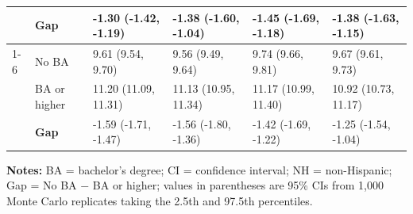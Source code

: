 \begin{threeparttable}
\begin{tabular}{llllll}
 & \textbf{Gap} & -1.30 (-1.42, -1.19) & -1.38 (-1.60, -1.04) & -1.45 (-1.69, -1.18) & -1.38 (-1.63, -1.15) \\
\cmidrule(lr){1-6}
\multirow{3}{*}{Hispanic} & No BA & 9.61 (9.54, 9.70) & 9.56 (9.49, 9.64) & 9.74 (9.66, 9.81) & 9.67 (9.61, 9.73) \\
 & BA or higher & 11.20 (11.09, 11.31) & 11.13 (10.95, 11.34) & 11.17 (10.99, 11.40) & 10.92 (10.73, 11.17) \\
 & \textbf{Gap} & -1.59 (-1.71, -1.47) & -1.56 (-1.80, -1.36) & -1.42 (-1.69, -1.22) & -1.25 (-1.54, -1.04) \\
\bottomrule
\end{tabular}
\begin{tablenotes}[flushleft]
\small
\item \textbf{Notes:} BA = bachelor's degree; CI = confidence interval; NH = non-Hispanic; Gap = No BA $-$ BA or higher; values in parentheses are 95\% CIs from 1,000 Monte Carlo replicates taking the 2.5th and 97.5th percentiles.
\end{tablenotes}
\end{threeparttable}
